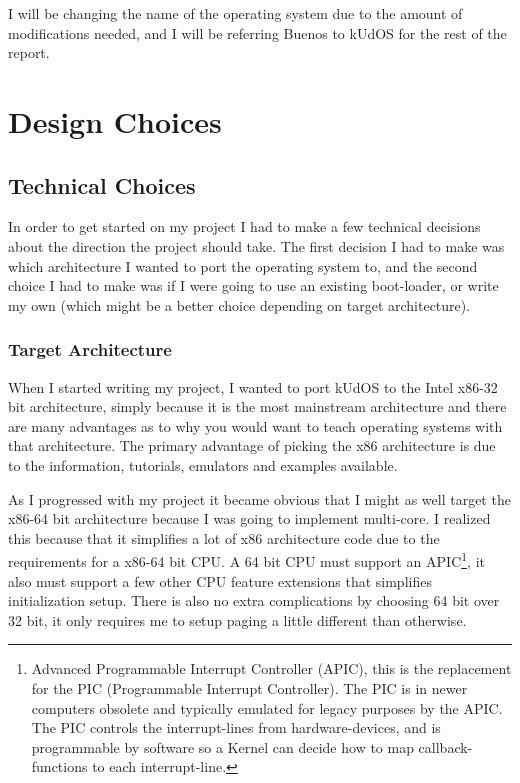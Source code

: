 I will be changing the name of the operating system due to the amount of modifications needed, and I will be referring Buenos to kUdOS for the rest of the report.

\newpage
\section{Design Choices}

\subsection{Technical Choices}

In order to get started on my project I had to make a few technical decisions about the direction the project should take. The first decision I had to make was which architecture I wanted to port the operating system to, and the second choice I had to make was if I were going to use an existing boot-loader, or write my own (which might be a better choice depending on target architecture).

\subsubsection{Target Architecture}

When I started writing my project, I wanted to port kUdOS to the Intel x86-32 bit architecture, simply because it is the most mainstream architecture and there are many advantages as to why you would want to teach operating systems with that architecture. The primary advantage of picking the x86 architecture is due to the information, tutorials, emulators and examples available. 

As I progressed with my project it became obvious that I might as well target the x86-64 bit architecture because I was going to implement multi-core. I realized this because that it simplifies a lot of x86 architecture code due to the requirements for a x86-64 bit CPU. A 64 bit CPU must support an APIC\footnote{Advanced Programmable Interrupt Controller (APIC), this is the replacement for the PIC (Programmable Interrupt Controller). The PIC is in newer computers obsolete and typically emulated for legacy purposes by the APIC. The PIC controls the interrupt-lines from hardware-devices, and is programmable by software so a Kernel can decide how to map callback-functions to each interrupt-line.}, it also must support a few other CPU feature extensions that simplifies initialization setup. There is also no extra complications by choosing 64 bit over 32 bit, it only requires me to setup paging a little different than otherwise.

